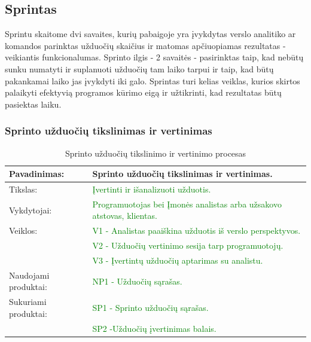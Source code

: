 \documentclass{VUMIFPSkursinis}
\begin{document}
	\subsection{Sprintas}
	Sprintu skaitome dvi savaites, kurių pabaigoje yra įvykdytas verslo analitiko ar komandos parinktas užduočių skaičius ir matomas apčiuopiamas rezultatas - veikiantis funkcionalumas.
	Sprinto ilgis - 2 savaitės - pasirinktas taip, kad nebūtų sunku numatyti ir suplanuoti užduočių tam laiko tarpui ir taip, kad būtų pakankamai laiko jas įvykdyti iki galo.
	Sprintas turi kelias veiklas, kurios skirtos palaikyti efektyvią programos kūrimo eigą ir užtikrinti, kad rezultatas būtų pasiektas laiku.

	\subsubsection{Sprinto užduočių tikslinimas ir vertinimas}
	\begin{center}
		\begin{table}[ht]
			\caption{Sprinto užduočių tikslinimo ir vertinimo procesas}
			\begin{tabular}{ | l | l | }
				\hline
				Pavadinimas:		& Sprinto užduočių tikslinimas ir vertinimas.				\\ \hline
				Tikslas: 		& \textcolor{green}{Įvertinti ir išanalizuoti užduotis.}					\\ \hline
				Vykdytojai:		& \textcolor{green}{Programuotojas bei Įmonės analistas arba užsakovo atstovas, klientas.}	\\ \hline
				Veiklos:		& \textcolor{green}{V1 - Analistas paaiškina užduotis iš verslo perspektyvos. }		\\
							& \textcolor{green}{V2 - Užduočių vertinimo sesija tarp programuotojų.	}		\\
							& \textcolor{green}{V3 - Įvertintų užduočių aptarimas su analistu. }			\\ \hline
				Naudojami produktai:	& \textcolor{green}{NP1 - Užduočių sąrašas. }						\\ \hline
				Sukuriami produktai:	& \textcolor{green}{SP1 - Sprinto užduočių sąrašas.} 					\\
							& \textcolor{green}{SP2 -Užduočių įvertinimas balais.	}				\\ \hline
			\end{tabular}
		\end{table}
	\end{center}
\end{document}
